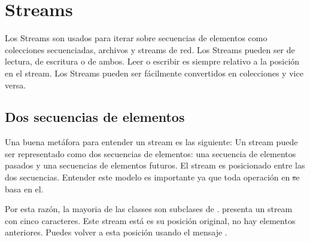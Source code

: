 \documentclass[a4paper,10pt,twoside]{book}
\begin{document}
	\sloppy
\fi
\chapter{Streams}


Los Streams son usados para iterar sobre secuencias de elementos como colecciones secuenciadas, archivos y streams de red.
Los Streams pueden ser de lectura, de escritura o de ambos.
Leer o escribir es siempre relativo a la posici\'on en el stream.
Los Streams pueden ser f\'acilmente convertidos en colecciones y vice versa.


\section{Dos secuencias de elementos}
Una buena met\'afora para entender un stream es las siguiente: Un stream puede ser representado como dos secuencias de elementos: una secuencia de 
elementos pasados y una secuencias de elementos futuros.
El stream es posicionado entre las dos secuencias. Entender este modelo es importante ya que toda operaci\'on en \st se basa en el.

Por esta raz\'on, la mayoria de las classes  son subclases de .
 presenta un stream con cinco caracteres. Este stream est\'a es su posici\'on original, \ie no hay elementos anteriores. 
Puedes volver a esta posici\'on usando el mensaje .
\end{document}
